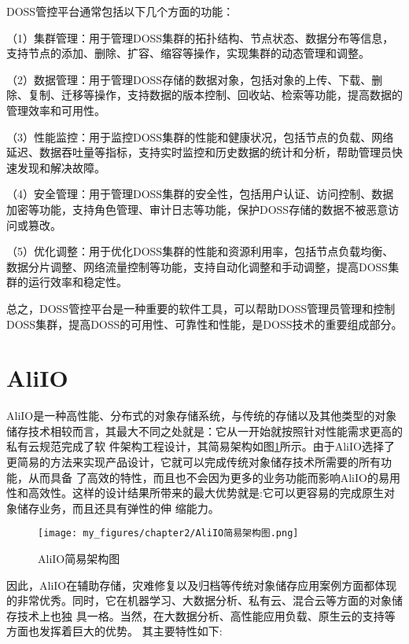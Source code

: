 DOSS管控平台通常包括以下几个方面的功能：

（1）集群管理：用于管理DOSS集群的拓扑结构、节点状态、数据分布等信息，支持节点的添加、删除、扩容、缩容等操作，实现集群的动态管理和调整。

（2）数据管理：用于管理DOSS存储的数据对象，包括对象的上传、下载、删除、复制、迁移等操作，支持数据的版本控制、回收站、检索等功能，提高数据的管理效率和可用性。

（3）性能监控：用于监控DOSS集群的性能和健康状况，包括节点的负载、网络延迟、数据吞吐量等指标，支持实时监控和历史数据的统计和分析，帮助管理员快速发现和解决故障。

（4）安全管理：用于管理DOSS集群的安全性，包括用户认证、访问控制、数据加密等功能，支持角色管理、审计日志等功能\cite{kongqii}，保护DOSS存储的数据不被恶意访问或篡改。

（5）优化调整：用于优化DOSS集群的性能和资源利用率，包括节点负载均衡、数据分片调整、网络流量控制等功能，支持自动化调整和手动调整，提高DOSS集群的运行效率和稳定性。

总之，DOSS管控平台是一种重要的软件工具，可以帮助DOSS管理员管理和控制DOSS集群，提高DOSS的可用性、可靠性和性能，是DOSS技术的重要组成部分。

\section{AliIO}

AliIO是一种高性能、分布式的对象存储系统，与传统的存储以及其他类型的对象储存技术相较而言，其最大不同之处就是：它从一开始就按照针对性能需求更高的私有云规范完成了软
件架构工程设计，其简易架构如图\ref{fig:/AliIO简易架构图}所示。由于AliIO选择了更简易的方法来实现产品设计，它就可以完成传统对象储存技术所需要的所有功能，从而具备
了高效的特性，而且也不会因为更多的业务功能而影响AliIO的易用性和高效性。这样的设计结果所带来的最大优势就是:它可以更容易的完成原生对象储存业务，而且还具有弹性的伸
缩能力。

\begin{figure}[h]
    \centering
    \texttt{[image: my\_figures/chapter2/AliIO简易架构图.png]}
    \caption{AliIO简易架构图}
    \label{fig:/AliIO简易架构图}
\end{figure}

因此，AliIO在辅助存储，灾难修复以及归档等传统对象储存应用案例方面都体现的非常优秀。同时，它在机器学习、大数据分析、私有云、混合云等方面的对象储存技术上也独
具一格。当然，在大数据分析、高性能应用负载、原生云的支持等方面也发挥着巨大的优势。
其主要特性如下:

